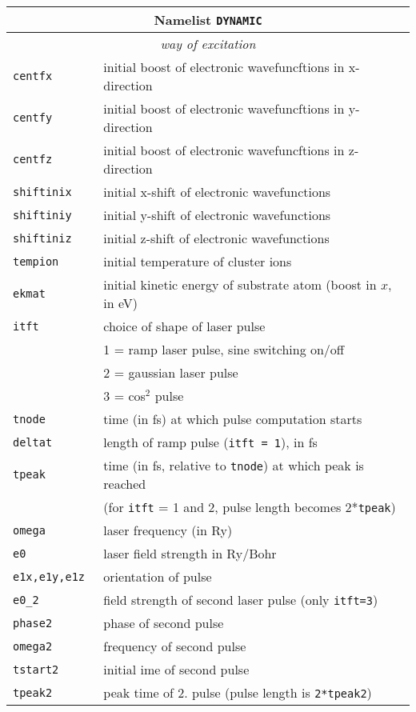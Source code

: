 \documentclass[12pt]{article}
\begin{document}
\begin{tabular}{ll}
\hline
\multicolumn{2}{c}{Namelist {\tt DYNAMIC}} in {\tt for005.<name>} \\
\hline
\multicolumn{2}{c}{\it way of excitation} \\
\hline
{\tt centfx           }& initial boost of electronic wavefuncftions in x-direction\\
{\tt centfy           }& initial boost of electronic wavefuncftions in y-direction\\
{\tt centfz           }& initial boost of electronic wavefuncftions in z-direction\\
{\tt shiftinix} & initial x-shift of electronic wavefunctions \\
{\tt shiftiniy} & initial y-shift of electronic wavefunctions  \\
{\tt shiftiniz} & initial z-shift of electronic wavefunctions  \\
{\tt tempion          }& initial temperature of cluster ions \\
{\tt ekmat} & initial kinetic energy of substrate atom (boost in $x$, in eV)\\
{\tt itft   }& choice of shape of laser pulse \\
&   1 = ramp laser pulse, sine switching on/off\\
&   2 = gaussian laser pulse \\
&   3 = cos$^2$ pulse\\
{\tt tnode  }& time (in fs) at which pulse computation starts\\
{\tt deltat }& length of ramp pulse ({\tt itft = 1}), in fs\\
{\tt tpeak  }& time (in fs, relative to {\tt tnode}) at which peak is reached\\
& (for {\tt itft} = 1 and 2, pulse length becomes 2*{\tt tpeak})\\
{\tt omega  }& laser frequency (in Ry)\\
{\tt e0     }& laser field strength in Ry/Bohr\\
{\tt e1x,e1y,e1z   }& orientation of pulse\\
{\tt e0\_2  }& field strength of second laser pulse (only {\tt itft=3}) \\
{\tt phase2 }& phase of second pulse \\
{\tt omega2 }& frequency of second pulse\\
{\tt tstart2}& initial ime of second pulse\\
{\tt tpeak2} & peak time of 2. pulse (pulse length is {\tt 2*tpeak2})\\

\end{tabular}
\end{document}
